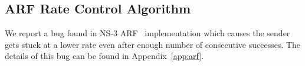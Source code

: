 \subsection{ARF Rate Control Algorithm}
\label{subsec:arf}

We report a bug found in NS-3 ARF~\cite{kamerman1997wavelan} implementation
which causes the sender gets stuck at a lower rate even after enough number of
consecutive successes. The details of this bug can be found in
Appendix~\ref{app:arf}.
